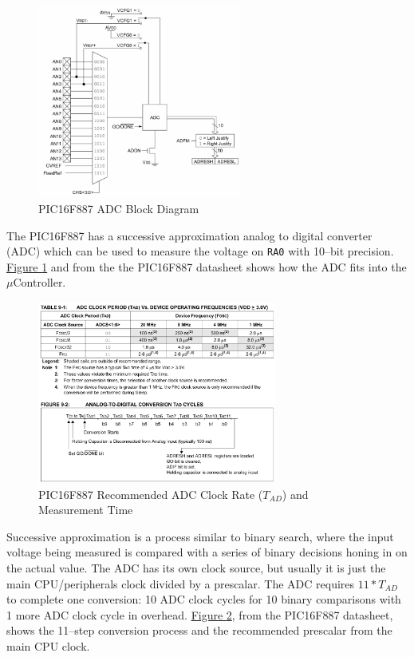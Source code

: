 \documentclass[11pt]{article}
\begin{document}
\begin{figure}
	\centering
	\includegraphics[width=0.6\textwidth]{Figures/pic16f887-adc-block-diagram.pdf}
	\caption{PIC16F887 ADC Block Diagram}
	\label{pic16f887-adc-block-diagram}
\end{figure}

The PIC16F887 has a successive approximation analog to digital converter (ADC)
which can be used to measure the voltage on \texttt{RA0} with 10--bit precision.
\hyperref[pic16f887-adc-block-diagram]{Figure \ref{pic16f887-adc-block-diagram}} and
from the the PIC16F887 datasheet shows how the ADC fits into the $\mu$Controller.

\begin{figure}
	\centering
	\includegraphics[width=0.7\textwidth]{Figures/pic16f887-adc-clock-sources-and-conversion-time.pdf}
	\caption{PIC16F887 Recommended ADC Clock Rate ($T_{AD}$) and Measurement Time}
	\label{pic16f887-adc-clock-sources-and-conversion-time}
\end{figure}

Successive approximation is a process similar to binary search, where the input
voltage being measured is compared with a series of binary decisions honing
in on the actual value. The ADC has its own clock source, but usually it is
just the main CPU/peripherals clock divided by a prescalar. The ADC requires
$11*T_{AD}$ to complete one conversion: 10 ADC clock cycles for 10 binary
comparisons with 1 more ADC clock cycle in overhead.
\hyperref[pic16f887-adc-clock-sources-and-conversion-time]{Figure
\ref{pic16f887-adc-clock-sources-and-conversion-time}}, from the PIC16F887
datasheet, shows the 11--step conversion process and the recommended
prescalar from the main CPU clock.
\end{document}
